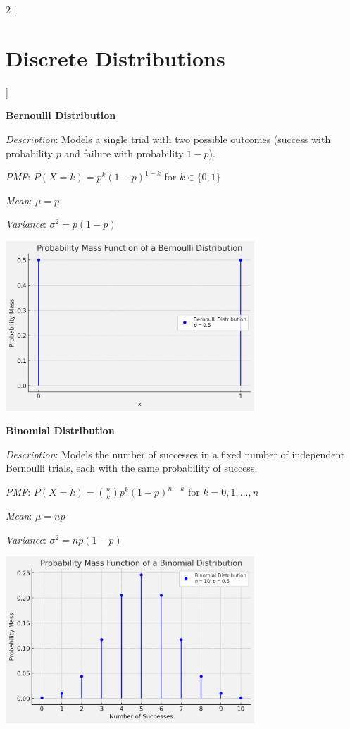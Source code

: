 \documentclass{article}
\begin{document}
\begin{multicols}{2}
[
\section*{Discrete Distributions}
]

\begin{mdframed}
\textbf{Bernoulli Distribution}

\textit{Description}: Models a single trial with two possible outcomes (success with probability $p$ and failure with probability $1-p$).

\textit{PMF}: $P(X=k) = p^k(1-p)^{1-k}$ for $k \in \{0,1\}$

\textit{Mean}: $\mu = p$

\textit{Variance}: $\sigma^2 = p(1-p)$

\begin{center}
  \includegraphics*[width=0.7\textwidth]{bernoulli.png}
\end{center}

\end{mdframed}

\begin{mdframed}
\textbf{Binomial Distribution}

\textit{Description}: Models the number of successes in a fixed number of independent Bernoulli trials, each with the same probability of success.

\textit{PMF}: $P(X=k) = \binom{n}{k}p^k(1-p)^{n-k}$ for $k = 0, 1, ..., n$

\textit{Mean}: $\mu = np$

\textit{Variance}: $\sigma^2 = np(1-p)$

\begin{center}
  \includegraphics*[width=0.7\textwidth]{binomial.png}
\end{center}


\end{mdframed}
\end{multicols}
\end{document}
